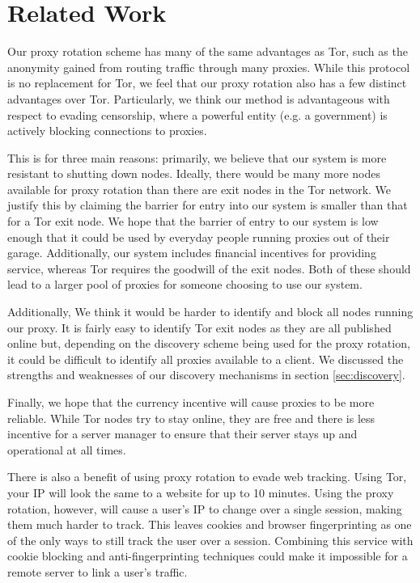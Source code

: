 \section{Related Work}
\label{sec:related}

Our proxy rotation scheme has many of the same advantages as Tor, such as the anonymity gained from routing traffic through many proxies. While this protocol is no replacement for Tor, we feel that our proxy rotation also has a few distinct advantages over Tor. Particularly, we think our method is advantageous with respect to evading censorship, where a powerful entity (e.g. a government) is actively blocking connections to proxies.

This is for three main reasons: primarily, we believe that our system is more resistant to shutting down nodes. Ideally, there would be many more nodes available for proxy rotation than there are exit nodes in the Tor network. We justify this by claiming the barrier for entry into our system is smaller than that for a Tor exit node. We hope that the barrier of entry to our system is low enough that it could be used by everyday people running proxies out of their garage.  Additionally, our system includes financial incentives for providing service, whereas Tor requires the goodwill of the exit nodes. Both of these should lead to a larger pool of proxies for someone choosing to use our system.

Additionally, We think it would be harder to identify and block all nodes running our proxy. It is fairly easy to identify Tor exit nodes as they are all published online\cite{tor:node} but, depending on the discovery scheme being used for the proxy rotation, it could be difficult to identify all proxies available to a client. We discussed the strengths and weaknesses of our discovery mechanisms in section \ref{sec:discovery}. 

Finally, we hope that the currency incentive will cause proxies to be more reliable. While Tor nodes try to stay online, they are free and there is less incentive for a server manager to ensure that their server stays up and operational at all times.

There is also a benefit of using proxy rotation to evade web tracking. Using Tor, your IP will look the same to a website for up to 10 minutes\cite{tor:faq}. Using the proxy rotation, however, will cause a user's IP to change over a single session, making them much harder to track. This leaves cookies and browser fingerprinting as one of the only ways to still track the user over a session. Combining this service with cookie blocking and anti-fingerprinting techniques could make it impossible for a remote server to link a user's traffic.


